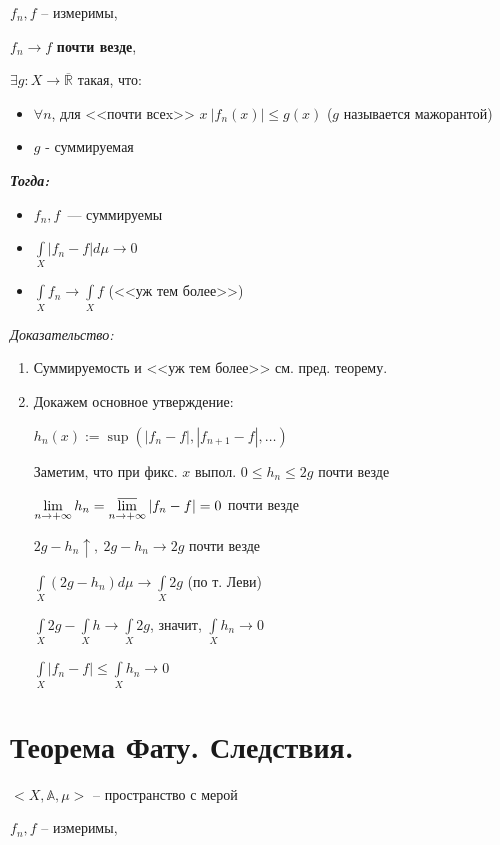 \documentclass[paper=a4, fontsize=17pt]{article}
\begin{document}
$f_n, f$ -- измеримы,

$f_n \rightarrow f$ \textbf{почти везде},

$\exists g : X \rightarrow \overline{\mathds{R}}$ такая, что:
\begin{itemize}
\item
$\forall n$,  для <<почти всеx>> $x ~ |f_n(x)| \leq g(x)$ ($g$ называется мажорантой)
\item
$g$ - суммируемая
\end{itemize}

\emph{\textbf{Тогда:}}
\begin{itemize}
    \item $f_n, f$~--- суммируемы
    \item $\int\limits_{X} |f_n - f| d\mu \rightarrow 0$
    \item $\int\limits_{X} f_n \rightarrow \int\limits_{X} f$ (<<уж тем более>>)
\end{itemize}

\emph{Доказательство:}

\begin{enumerate}
	\item Суммируемость и <<уж тем более>> см. пред. теорему.

	\item Докажем основное утверждение:

	$ h_n(x) := \sup(|f_n - f|, |f_{n+1} - f|, \dots) $

	Заметим, что при фикс. $ x $ выпол. $ 0 \leq h_n \leq 2g $ почти везде

	$ \lim\limits_{n \rightarrow +\infty} h_n =
	\varlimsup\limits_{n \rightarrow +\infty} |f_n - f| = 0 $ почти везде

	$ 2g - h_n \uparrow , ~ 2g - h_n \rightarrow 2g$ почти везде

	$ \int\limits_{X}(2g - h_n) d\mu \rightarrow \int\limits_{X} 2g $
	(по т. Леви)

	$ \int\limits_{X} 2g - \int\limits_{X} h \to \int\limits_{X} 2g$, значит, $\int\limits_{X} h_n \rightarrow 0 $  

	$ \int\limits_{X} |f_n - f| \leq \int\limits_{X} h_n \rightarrow 0 $
\end{enumerate}

\section{Теорема Фату. Следствия.}
$<X, \mathds{A}, \mu>$ -- пространство с мерой

$f_n, f$ -- измеримы,
\end{document}
